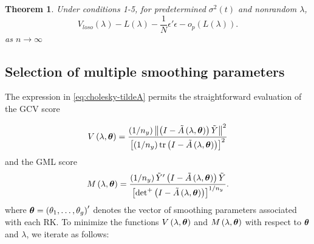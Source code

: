 \documentclass[12pt]{article}
\newcommand{\tildeY}{\tilde{Y}}
\newcommand{\tildeA}{\tilde{A}}
\newcommand{\bftheta}{\mbox{\boldmath $\theta$}}
\newtheorem{theorem}{Theorem}[section]
\theoremstyle{definition}
\begin{document}
\begin{theorem} \label{thm:asymptotic-equiv-of-losocv}
Under conditions 1-5, for predetermined $\sigma^2\left(t\right)$ and nonrandom $\lambda$, 
\begin{equation}
V_{loso}\left(\lambda \right) - L\left(\lambda \right) - \frac{1}{N} \epsilon'\epsilon - o_p\left( L\left(\lambda \right)\right).
\end{equation}
\noindent
as $n \rightarrow \infty$ 
\end{theorem}
  
\vspace{0.8in} 


\subsection{Selection of multiple smoothing parameters}

The expression in \ref{eq:cholesky-tildeA} permits the straightforward evaluation of the GCV score

\begin{equation} \label{eq:general-GCV-score}
V\left(\lambda, \bftheta \right) = \frac{\left( 1/n_y \right)  \left \lVert \left(I - \tildeA\left(\lambda, \bftheta \right)\right) \tildeY \right\rVert^2}{\left[\left( 1/n_y \right) \textup{tr} \left(I - \tildeA\left(\lambda, \bftheta \right)\right)  \right]^2}
\end{equation}
\noindent
and the GML score
\begin{equation} \label{eq:general-GML-score}
M\left(\lambda, \bftheta \right) = \frac{\left( 1/n_y \right) \tildeY' \left(I - \tildeA\left(\lambda, \bftheta \right)\right) \tildeY }{\left[ \mbox{det}^+\left(I - \tildeA\left(\lambda, \bftheta \right)\right)  \right]^{1/n_y}}.
\end{equation}
\noindent
where $\bftheta = \left(\theta_1,\dots, \theta_g\right)'$ denotes the vector of smoothing parameters associated with each RK.
\bigskip
To minimize the functions $V\left(\lambda, \bftheta\right)$ and $M\left(\lambda, \bftheta\right)$ with respect to $\bftheta$ and $\lambda$, we iterate as follows:
\end{document}
